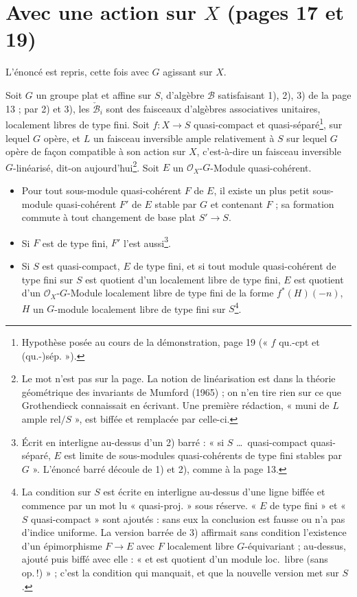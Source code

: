 \documentclass[11pt,a4paper]{article}
\begin{document}
\section*{Avec une action sur $X$ (pages 17 et 19)}

L'énoncé est repris, cette fois avec $G$ agissant sur $X$.

Soit $G$ un groupe plat et affine sur $S$, d'algèbre $\mathcal{B}$
satisfaisant 1), 2), 3) de la page 13 ; par 2) et 3), les
$\check{\mathcal{B}}_i$ sont des faisceaux d'algèbres associatives
unitaires, localement libres de type fini. Soit $f \colon X \to S$
quasi-compact et quasi-séparé\footnote{Hypothèse posée au cours de la
démonstration, page 19 (« $f$ qu.-cpt et (qu.-)sép. »).}, sur lequel $G$
opère, et $L$ un faisceau inversible ample relativement à $S$ sur lequel
$G$ opère de façon compatible à son action sur $X$, c'est-à-dire un
faisceau inversible $G$-linéarisé, dit-on aujourd'hui\footnote{Le mot n'est pas sur
la page. La notion de linéarisation est dans la théorie géométrique des
invariants de Mumford (1965) ; on n'en tire rien sur ce que Grothendieck
connaissait en écrivant. Une première rédaction, « muni de $L$ ample
rel$/S$ », est biffée et remplacée par celle-ci.}. Soit $E$ un
$\mathcal{O}_X$-$G$-Module quasi-cohérent.
\begin{itemize}
  \item[1)] Pour tout sous-module quasi-cohérent $F$ de $E$, il existe un
    plus petit sous-module quasi-cohérent $F'$ de $E$ stable par $G$ et
    contenant $F$ ; sa formation commute à tout changement de base plat
    $S' \to S$.
  \item[2)] Si $F$ est de type fini, $F'$ l'est aussi\footnote{Écrit en
    interligne au-dessus d'un 2) barré : « si $S$ \ldots\ quasi-compact
    quasi-séparé, $E$ est limite de sous-modules quasi-cohérents de type
    fini stables par $G$ ». L'énoncé barré découle de 1) et 2), comme à la page 13.}.
  \item[3)] Si $S$ est quasi-compact, $E$ de type fini, et si tout module
    quasi-cohérent de type fini sur $S$ est quotient d'un localement libre
    de type fini, $E$ est quotient d'un $\mathcal{O}_X$-$G$-Module
    localement libre de type fini de la forme $f^{*}(H)(-n)$, $H$ un
    $G$-module localement libre de type fini sur $S$\footnote{La condition
    sur $S$ est écrite en interligne au-dessus d'une ligne biffée et
    commence par un mot lu « quasi-proj. » sous réserve. « $E$ de type
    fini » et « $S$ quasi-compact » sont ajoutés : sans eux la conclusion
    est fausse ou n'a pas d'indice uniforme. La version barrée de 3)
    affirmait sans condition l'existence d'un épimorphisme $F \to E$ avec
    $F$ localement libre $G$-équivariant ; au-dessus, ajouté puis biffé
    avec elle : « et est quotient d'un module loc.\ libre (sans op.\,!) » ;
    c'est la condition qui manquait, et que la nouvelle version met sur
    $S$.}.
\end{itemize}
\end{document}
